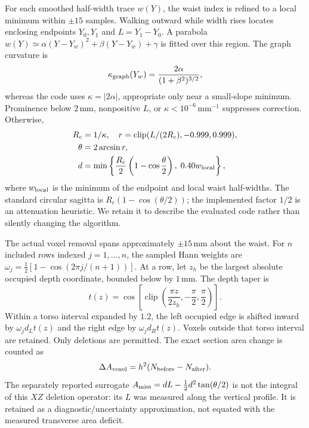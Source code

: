 \documentclass[11pt,a4paper]{article}
\numberwithin{equation}{section}
\begin{document}
For each smoothed half-width trace $w(Y)$, the waist index is refined to a local minimum within $\pm15$ samples. Walking outward while width rises locates enclosing endpoints $Y_0,Y_1$ and $L=Y_1-Y_0$. A parabola $w(Y)\simeq\alpha(Y-Y_w)^2+\beta(Y-Y_w)+\gamma$ is fitted over this region. The graph curvature is
\begin{equation}
\kappa_{\rm graph}(Y_w)=\frac{2\alpha}{(1+\beta^2)^{3/2}},
\label{eq:waist_curvature}
\end{equation}
whereas the code uses $\kappa=|2\alpha|$, appropriate only near a small-slope minimum. Prominence below $2$\,mm, nonpositive $L$, or $\kappa<10^{-6}$\,mm$^{-1}$ suppresses correction. Otherwise,
\begin{align}
R_c&=1/\kappa,\quad r=\operatorname{clip}(L/(2R_c),-0.999,0.999),\nonumber\\
\theta&=2\arcsin r,\label{eq:theta_arc}\\
d&=\min\left\{\frac{R_c}{2}\left(1-\cos\frac\theta2\right),\;0.40w_{\rm local}\right\},
\label{eq:sagitta}
\end{align}
where $w_{\rm local}$ is the minimum of the endpoint and local waist half-widths. The standard circular sagitta is $R_c(1-\cos(\theta/2))$; the implemented factor $1/2$ is an attenuation heuristic. We retain it to describe the evaluated code rather than silently changing the algorithm.

The actual voxel removal spans approximately $\pm15$\,mm about the waist. For $n$ included rows indexed $j=1,\ldots,n$, the sampled Hann weights are $\omega_j=\tfrac12[1-\cos(2\pi j/(n+1))]$. At a row, let $z_h$ be the largest absolute occupied depth coordinate, bounded below by $1$\,mm. The depth taper is
\begin{equation}
t(z)=\cos\!\left[\operatorname{clip}\left(\frac{\pi z}{2z_h},-\frac\pi2,\frac\pi2\right)\right].
\end{equation}
Within a torso interval expanded by $1.2$, the left occupied edge is shifted inward by $\omega_jd_Lt(z)$ and the right edge by $\omega_jd_Rt(z)$. Voxels outside that torso interval are retained. Only deletions are permitted. The exact section area change is counted as
\begin{equation}
\Delta A_{\rm voxel}=h^2(N_{\rm before}-N_{\rm after}).
\end{equation}
The separately reported surrogate $A_{\rm miss}=dL-\tfrac12d^2\tan(\theta/2)$ is not the integral of this $XZ$ deletion operator: its $L$ was measured along the vertical profile. It is retained as a diagnostic/uncertainty approximation, not equated with the measured transverse area deficit.
\end{document}
